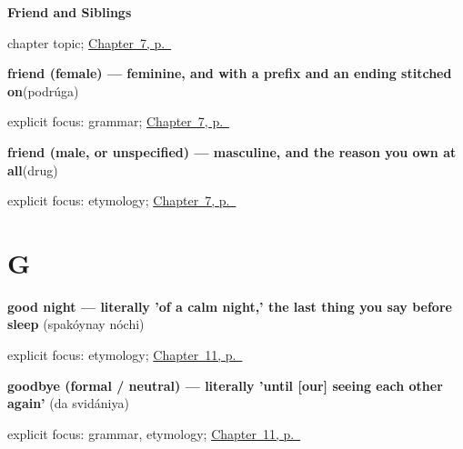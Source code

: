 \noindent\begin{minipage}[t]{\linewidth}
\raggedright
\textbf{Friend and Siblings}\par
\footnotesize chapter topic; \hyperref[ch:russian-friend-and-siblings]{Chapter~7, p.~\pageref*{ch:russian-friend-and-siblings}}
\end{minipage}\par\smallskip

\noindent\begin{minipage}[t]{\linewidth}
\raggedright
\textbf{friend (female) — feminine, and  with a prefix and an ending stitched on}\enspace\emph{}\enspace(podrúga)\par
\footnotesize explicit focus: grammar; \hyperref[ch:russian-friend-and-siblings]{Chapter~7, p.~\pageref*{ch:russian-friend-and-siblings}}
\end{minipage}\par\smallskip

\noindent\begin{minipage}[t]{\linewidth}
\raggedright
\textbf{friend (male, or unspecified) — masculine, and the reason you own  at all}\enspace\emph{}\enspace(drug)\par
\footnotesize explicit focus: etymology; \hyperref[ch:russian-friend-and-siblings]{Chapter~7, p.~\pageref*{ch:russian-friend-and-siblings}}
\end{minipage}\par\smallskip

\section*{G}

\noindent\begin{minipage}[t]{\linewidth}
\raggedright
\textbf{good night — literally 'of a calm night,' the last thing you say before sleep}\enspace\emph{ }\enspace(spakóynay nóchi)\par
\footnotesize explicit focus: etymology; \hyperref[ch:russian-parting-words]{Chapter~11, p.~\pageref*{ch:russian-parting-words}}
\end{minipage}\par\smallskip

\noindent\begin{minipage}[t]{\linewidth}
\raggedright
\textbf{goodbye (formal / neutral) — literally 'until {[}our{]} seeing each other again'}\enspace\emph{ }\enspace(da svidániya)\par
\footnotesize explicit focus: grammar, etymology; \hyperref[ch:russian-parting-words]{Chapter~11, p.~\pageref*{ch:russian-parting-words}}
\end{minipage}\par\smallskip

